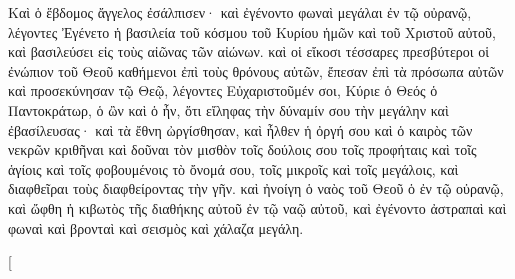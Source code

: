 \begin{pages}
\begin{Rightside}
		\pend
		\pstart
		Καὶ ὁ ἕβδομος ἄγγελος ἐσάλπισεν· καὶ ἐγένοντο φωναὶ μεγάλαι ἐν τῷ οὐρανῷ, λέγοντες Ἐγένετο ἡ βασιλεία τοῦ κόσμου τοῦ Κυρίου ἡμῶν καὶ τοῦ Χριστοῦ αὐτοῦ, καὶ βασιλεύσει εἰς 	τοὺς αἰῶνας τῶν αἰώνων. καὶ οἱ εἴκοσι τέσσαρες πρεσβύτεροι οἱ ἐνώπιον τοῦ Θεοῦ καθήμενοι ἐπὶ τοὺς θρόνους αὐτῶν, ἔπεσαν ἐπὶ τὰ πρόσωπα αὐτῶν καὶ προσεκύνησαν τῷ Θεῷ, λέγοντες Εὐχαριστοῦμέν σοι, Κύριε ὁ Θεός ὁ Παντοκράτωρ, ὁ ὢν καὶ ὁ ἦν, ὅτι εἴληφας τὴν δύναμίν 	σου τὴν μεγάλην καὶ ἐβασίλευσας· καὶ τὰ ἔθνη ὠργίσθησαν, καὶ ἦλθεν ἡ ὀργή σου καὶ ὁ 	καιρὸς τῶν νεκρῶν κριθῆναι καὶ δοῦναι τὸν μισθὸν τοῖς δούλοις σου τοῖς προφήταις καὶ 	τοῖς ἁγίοις καὶ τοῖς φοβουμένοις τὸ ὄνομά σου, τοῖς μικροῖς καὶ τοῖς μεγάλοις, καὶ 	διαφθεῖραι τοὺς διαφθείροντας τὴν γῆν.
		\pend
		\pstart
		καὶ ἠνοίγη ὁ ναὸς τοῦ Θεοῦ ὁ ἐν τῷ οὐρανῷ, καὶ ὤφθη ἡ κιβωτὸς τῆς διαθήκης αὐτοῦ ἐν τῷ ναῷ αὐτοῦ, καὶ ἐγένοντο ἀστραπαὶ καὶ φωναὶ καὶ βρονταὶ καὶ σεισμὸς καὶ χάλαζα μεγάλη.		
		\pend
        \endnumbering
    \end{Rightside}
    \begin{Leftside}
        \beginnumbering
        \pstart[

\end{Leftside}
\end{pages}
